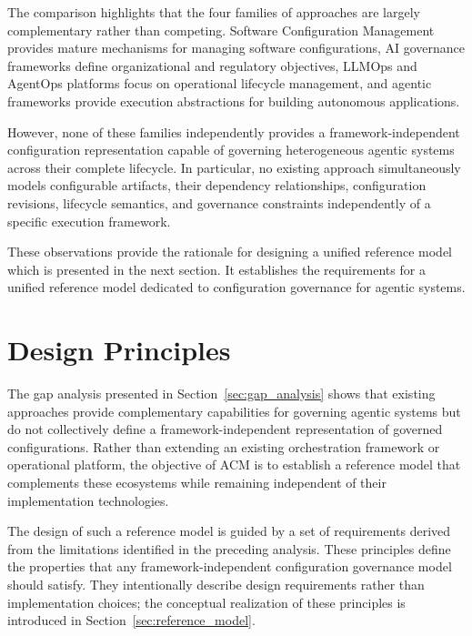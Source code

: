 \documentclass[10pt]{article}
\begin{document}
The comparison highlights that the four families of approaches are largely complementary rather than competing. Software Configuration Management provides mature mechanisms for managing software configurations, AI governance frameworks define organizational and regulatory objectives, LLMOps and AgentOps platforms focus on operational lifecycle management, and agentic frameworks provide execution abstractions for building autonomous applications.

However, none of these families independently provides a framework-independent configuration representation capable of governing heterogeneous agentic systems across their complete lifecycle. In particular, no existing approach simultaneously models configurable artifacts, their dependency relationships, configuration revisions, lifecycle semantics, and governance constraints independently of a specific execution framework.

These observations provide the rationale for designing a unified reference model which is presented in the next section. It establishes the requirements for a unified reference model dedicated to configuration governance for agentic systems.

\section{Design Principles}
\label{sec:design_principles}

The gap analysis presented in Section~\ref{sec:gap_analysis} shows that existing approaches provide complementary capabilities for governing agentic systems but do not collectively define a framework-independent representation of governed configurations. Rather than extending an existing orchestration framework or operational platform, the objective of ACM is to establish a reference model that complements these ecosystems while remaining independent of their implementation technologies.

The design of such a reference model is guided by a set of requirements derived from the limitations identified in the preceding analysis. These principles define the properties that any framework-independent configuration governance model should satisfy. They intentionally describe design requirements rather than implementation choices; the conceptual realization of these principles is introduced in Section~\ref{sec:reference_model}.
\end{document}
